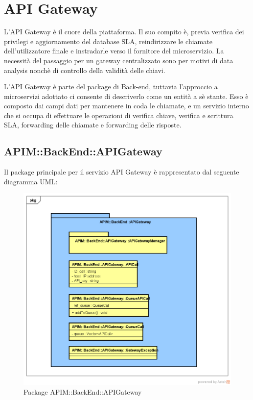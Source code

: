 \newpage
\section{API Gateway}

L'API Gateway è il cuore della piattaforma. Il suo compito è, previa verifica dei privilegi e aggiornamento del database SLA, reindirizzare le chiamate dell'utilizzatore finale e instradarle verso il fornitore del microservizio.  La necessità del passaggio per un gateway centralizzato sono per motivi di data analysis nonchè di controllo della validità delle chiavi.

L'API Gateway è parte del package di Back-end, tuttavia l'approccio a microservizi adottato ci consente di descriverlo come un entità a sè stante. Esso è composto dai campi dati per mantenere in coda le chiamate, e un servizio interno che si occupa di effettuare le operazioni di verifica chiave, verifica e scrittura SLA, forwarding delle chiamate e forwarding delle risposte. 

\subsection{APIM::BackEnd::APIGateway}

Il package principale per il servizio API Gateway è rappresentato dal seguente diagramma UML:

\begin{figure}[H]
	\centering
	\includegraphics[width=0.7\linewidth]{UML/DiagrammiPackage/APIGateway.png}
	\caption{Package APIM::BackEnd::APIGateway}
\end{figure}